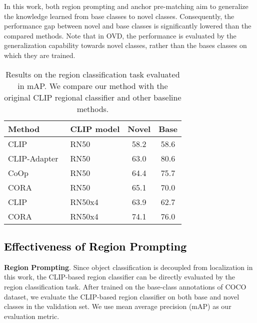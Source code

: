 \documentclass[10pt,twocolumn,letterpaper]{article}
\begin{document}
In this work, both region prompting and anchor pre-matching aim to generalize the knowledge learned from base classes to novel classes.
Consequently, the performance gap between novel and base classes is significantly lowered than the compared methods. 
Note that in OVD, the performance is evaluated by the generalization capability towards novel classes, rather than the bases classes on which they are trained.

\begin{table}[]
\centering
\begin{tabular}{l|lcc}
\toprule
Method       & CLIP model & Novel & Base                        \\
\midrule
CLIP         & RN50       & 58.2  & {\color[HTML]{C0C0C0} 58.6} \\
CLIP-Adapter~\cite{clipadapter} & RN50       & 63.0  & {\color[HTML]{C0C0C0} 80.6} \\
CoOp~\cite{coop}         & RN50       & 64.4  & {\color[HTML]{C0C0C0} 75.7}  \\
CORA         & RN50       & 65.1  & {\color[HTML]{C0C0C0} 70.0} \\
\midrule
CLIP         & RN50x4     & 63.9  & {\color[HTML]{C0C0C0} 62.7} \\
CORA         & RN50x4     & 74.1  & {\color[HTML]{C0C0C0} 76.0} \\
\bottomrule
\end{tabular}
\caption{Results on the region classification task evaluated in mAP. We compare our method with the original CLIP regional classifier and other baseline methods.}
\label{tab:region_prompting}
\end{table} \subsection{\textcolor{black}{Effectiveness of Region Prompting}}
\label{sec:region_prompt}
\noindent\textbf{Region Prompting}. Since object classification is decoupled from localization in this work, the CLIP-based region classifier can be directly evaluated by the region classification task.
After trained on the base-class annotations of COCO dataset, we evaluate the CLIP-based region classifier on both base and novel classes in the validation set.
We use mean average precision (mAP) as our evaluation metric.
\end{document}
